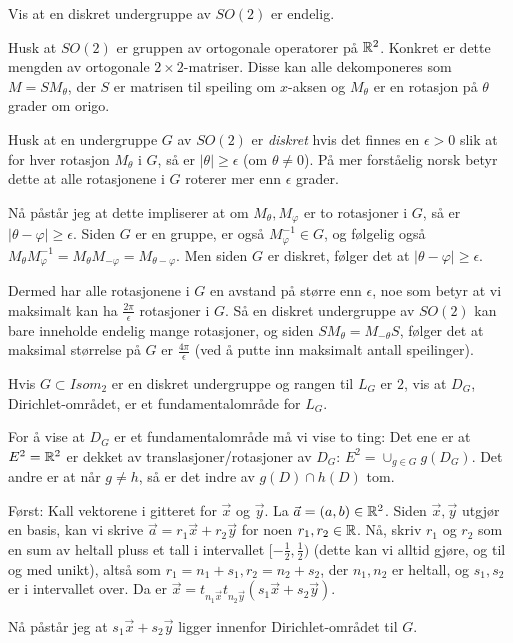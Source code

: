 \documentclass[11pt, norsk]{article}
\begin{document}
\begin{oppg}
Vis at en diskret undergruppe av $SO(2)$ er endelig.
\end{oppg}
\begin{losn}
Husk at $SO(2)$ er gruppen av ortogonale operatorer på $\mathbb{R}^2$. Konkret er dette mengden av ortogonale $2 \times 2$-matriser. Disse kan alle dekomponeres som $M=SM_\theta$, der $S$ er matrisen til speiling om $x$-aksen og $M_\theta$ er en rotasjon på $\theta$ grader om origo.

Husk at en undergruppe $G$ av $SO(2)$ er \emph{diskret} hvis det finnes en $\epsilon > 0$ slik at for hver rotasjon $M_\theta$ i $G$, så er $\lvert \theta \rvert \geq \epsilon$ (om $\theta \neq 0$). På mer forståelig norsk betyr dette at alle rotasjonene i $G$ roterer mer enn $\epsilon$ grader.

Nå påstår jeg at dette impliserer at om $M_\theta,M_\varphi$ er to rotasjoner i $G$, så er $\lvert\theta - \varphi\rvert \geq \epsilon$. Siden $G$ er en gruppe, er også $M_\varphi^{-1} \in G$, og følgelig også $M_{\theta}M_{\varphi}^{-1} = M_\theta M_{-\varphi}=M_{\theta-\varphi}$. Men siden $G$ er diskret, følger det at $\lvert \theta - \varphi\rvert \geq \epsilon$.

Dermed har alle rotasjonene i $G$ en avstand på større enn $\epsilon$, noe som betyr at vi maksimalt kan ha $\frac{2\pi}{\epsilon}$ rotasjoner i $G$. Så en diskret undergruppe av $SO(2)$ kan bare inneholde endelig mange rotasjoner, og siden $SM_\theta = M_{-\theta}S$, følger det at maksimal størrelse på $G$ er $\frac{4\pi}{\epsilon}$ (ved å putte inn maksimalt antall speilinger).
\end{losn}

\begin{oppg}
 Hvis $G \subset Isom_2$ er en diskret undergruppe og rangen til $L_G$ er $2$, vis at $D_G$, Dirichlet-området, er et fundamentalområde for $L_G$.
\end{oppg}

\begin{losn}
For å vise at $D_G$ er et fundamentalområde må vi vise to ting: Det ene er at $E^2=\mathbb{R}^2$ er dekket av translasjoner/rotasjoner av $D_G$: $E^2 = \cup_{g \in G} g(D_G)$. Det andre er at når $g \neq h$, så er det indre av $g(D) \cap h(D)$ tom.

Først: Kall vektorene i gitteret for $\vec x$ og $\vec y$. La $\vec a = (a,b) \in \mathbb{R}^2$. Siden $\vec x,\vec y$ utgjør en basis, kan vi skrive $\vec a = r_1 \vec x + r_2 \vec y$ for noen $r_1,r_2 \in \mathbb{R}$. Nå, skriv $r_1$ og $r_2$ som en sum av heltall pluss et tall i intervallet $[-\frac 12,\frac 12)$ (dette kan vi alltid gjøre, og til og med unikt), altså som $r_1=n_1 + s_1, r_2=n_2+s_2$, der $n_1,n_2$ er heltall, og $s_1,s_2$ er i intervallet over. Da er $\vec x = t_{n_1 \vec x}t_{n_2 \vec y}(s_1 \vec x + s_2 \vec y)$.

Nå påstår jeg at $s_1 \vec x + s_2 \vec y$ ligger innenfor Dirichlet-området til $G$.
\end{losn}
\end{document}
